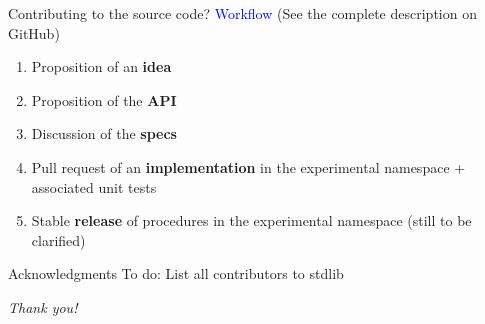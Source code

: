 \documentclass{beamer}
\begin{document}
\begin{frame}[c]{Contributing to the source code?}
	\textcolor{blue}{Workflow} (See the complete description on GitHub)
	\begin{enumerate}
		\item Proposition of an \textbf{idea}
		\item Proposition of the \textbf{API}
		\item Discussion of the \textbf{specs}
		\item Pull request of an \textbf{implementation} in the experimental namespace + associated unit tests
		\item Stable \textbf{release} of procedures in the experimental namespace (still to be clarified)
	\end{enumerate}
\end{frame}


\begin{frame}[c]{Acknowledgments}
	To do: List all contributors to stdlib
\end{frame}

\begin{frame}[c]{}
	\centering \Huge
	\emph{Thank you!}
\end{frame}
\end{document}
